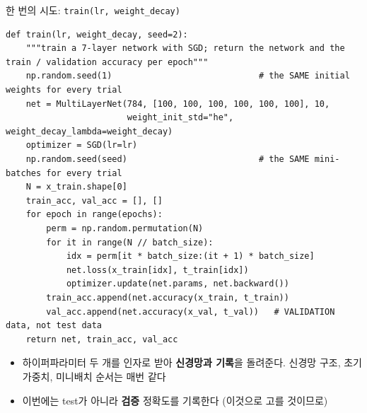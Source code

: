 \documentclass[aspectratio=169,11pt]{beamer}
\newcommand{\codesmall}{\ttfamily\fontsize{7.4}{8.3}\selectfont}
\newcommand{\code}[1]{\texttt{#1}}
\begin{document}
\begin{frame}{한 번의 시도: \code{train(lr, weight\_decay)}}
\small
\begin{lstlisting}[basicstyle=\codesmall]
def train(lr, weight_decay, seed=2):
    """train a 7-layer network with SGD; return the network and the train / validation accuracy per epoch"""
    np.random.seed(1)                             # the SAME initial weights for every trial
    net = MultiLayerNet(784, [100, 100, 100, 100, 100, 100], 10,
                        weight_init_std="he", weight_decay_lambda=weight_decay)
    optimizer = SGD(lr=lr)
    np.random.seed(seed)                          # the SAME mini-batches for every trial
    N = x_train.shape[0]
    train_acc, val_acc = [], []
    for epoch in range(epochs):
        perm = np.random.permutation(N)
        for it in range(N // batch_size):
            idx = perm[it * batch_size:(it + 1) * batch_size]
            net.loss(x_train[idx], t_train[idx])
            optimizer.update(net.params, net.backward())
        train_acc.append(net.accuracy(x_train, t_train))
        val_acc.append(net.accuracy(x_val, t_val))   # VALIDATION data, not test data
    return net, train_acc, val_acc
\end{lstlisting}
\small
\begin{itemize}
\item 하이퍼파라미터 두 개를 인자로 받아 \textbf{신경망과 기록}을 돌려준다. 신경망 구조, 초기 가중치, 미니배치 순서는 매번 같다
\item 이번에는 test가 아니라 \textbf{검증} 정확도를 기록한다 (이것으로 고를 것이므로)
\end{itemize}
\end{frame}
\end{document}
